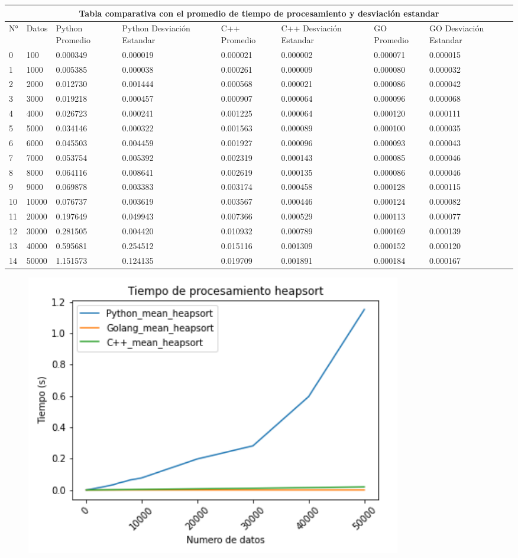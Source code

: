 \documentclass{article}
\begin{document}
\begin{enumerate}
\begin{tabular}{ |p{0.3cm}||p{0.9cm}|p{1.5cm}|p{1.7cm}|p{1.5cm}|p{1.7cm}|p{1.8cm}|p{1.7cm}|  }
 \hline
 \multicolumn{8}{|c|}{Tabla comparativa con el promedio de tiempo de procesamiento y desviación estandar} \\
 \hline
 N°& Datos &Python Promedio &Python Desviación Estandar &C++ Promedio &C++ Desviación Estandar &GO Promedio &GO Desviación Estandar\\
 \hline
0	&100	&0.000349	&0.000019	&0.000021	&0.000002	&0.000071	&0.000015\\
1	&1000	&0.005385	&0.000038	&0.000261	&0.000009	&0.000080	&0.000032\\
2	&2000	&0.012730	&0.001444	&0.000568	&0.000021	&0.000086	&0.000042\\
3	&3000	&0.019218	&0.000457	&0.000907	&0.000064	&0.000096	&0.000068\\
4	&4000	&0.026723	&0.000241	&0.001225	&0.000064	&0.000120	&0.000111\\
5	&5000	&0.034146	&0.000322	&0.001563	&0.000089	&0.000100	&0.000035\\
6	&6000	&0.045503	&0.004459	&0.001927	&0.000096	&0.000093	&0.000043\\
7	&7000	&0.053754	&0.005392	&0.002319	&0.000143	&0.000085	&0.000046\\
8	&8000	&0.064116	&0.008641	&0.002619	&0.000135	&0.000086	&0.000046\\
9	&9000	&0.069878	&0.003383	&0.003174	&0.000458	&0.000128	&0.000115\\
10	&10000	&0.076737	&0.003619	&0.003567	&0.000446	&0.000124	&0.000082\\
11	&20000	&0.197649	&0.049943	&0.007366	&0.000529	&0.000113	&0.000077\\
12	&30000	&0.281505	&0.004420	&0.010932	&0.000789	&0.000169	&0.000139\\
13	&40000	&0.595681	&0.254512	&0.015116	&0.001309	&0.000152	&0.000120\\
14	&50000	&1.151573	&0.124135	&0.019709	&0.001891	&0.000184	&0.000167\\
 \hline
\end{tabular}

\begin{figure}[H]
\centering
\includegraphics[width=0.8\textwidth]{Imagen/GHS1.png}
\label{fig:QuickSort}
\end{figure}


\end{enumerate}
\end{document}
